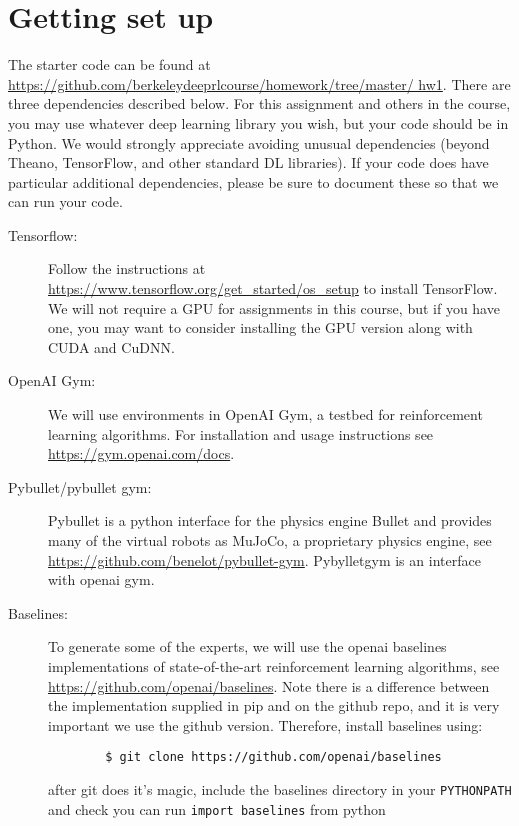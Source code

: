 \documentclass[12pt,twoside]{article}
\begin{document}
\section{Getting set up}
The starter code can be found at \url{https://github.com/berkeleydeeprlcourse/homework/tree/master/
hw1}. There are three dependencies described below. For this assignment and others in the course, you may
use whatever deep learning library you wish, but your code should be in Python. We would strongly appreciate avoiding unusual dependencies (beyond Theano, TensorFlow, and other standard DL libraries). If
your code does have particular additional dependencies, please be sure to document these so that we can
run your code.
\begin{description}
	\item[Tensorflow:]  Follow the instructions at \url{https://www.tensorflow.org/get_started/os_setup} to
	install TensorFlow. We will not require a GPU for assignments in this course, but if you have one,
	you may want to consider installing the GPU version along with CUDA and CuDNN. %
	\item[OpenAI Gym:] We will use environments in OpenAI Gym, a testbed for reinforcement learning
	algorithms. For installation and usage instructions see \url{https://gym.openai.com/docs}. %
	\item[Pybullet/pybullet gym:] Pybullet is a python interface for the physics engine Bullet and provides many of the virtual robots as MuJoCo, a proprietary physics engine, see \url{https://github.com/benelot/pybullet-gym}. Pybylletgym is an interface with openai gym.
	\item[Baselines:] To generate some of the experts, we will use the openai baselines implementations of state-of-the-art reinforcement learning algorithms, see \url{https://github.com/openai/baselines}. Note there is a difference between the implementation supplied in pip and on the github repo, and it is very important we use the github version. Therefore, install baselines using:
	\begin{commandline}
		\begin{verbatim}
		$ git clone https://github.com/openai/baselines
		\end{verbatim}
	\end{commandline}
	after git does it's magic, include the baselines directory in your \verb|PYTHONPATH| and check you can run \texttt{import baselines} from python
\end{description}
\end{document}
